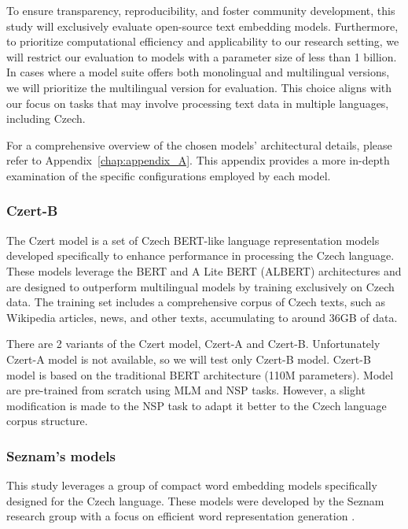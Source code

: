 To ensure transparency, reproducibility, and foster community development, this study will exclusively evaluate open-source text embedding models.  Furthermore, to prioritize computational efficiency and applicability to our research setting, we will restrict our evaluation to models with a parameter size of less than 1 billion.
In cases where a model suite offers both monolingual and multilingual versions, we will prioritize the multilingual version for evaluation. This choice aligns with our focus on tasks that may involve processing text data in multiple languages, including Czech.

For a comprehensive overview of the chosen models' architectural details, please refer to Appendix~\ref{chap:appendix_A}.
This appendix provides a more in-depth examination of the specific configurations employed by each model.

\subsubsection{Czert-B} \label{modelczert-b}

The Czert model \cite{sido2021czert} is a set of Czech \ac{BERT}-like language representation models developed specifically to enhance performance in processing the Czech language.
These models leverage the \ac{BERT} and A Lite \ac{BERT} (ALBERT) \cite{lan2020albert} architectures and are designed to outperform multilingual models by training exclusively on Czech data.
The training set includes a comprehensive corpus of Czech texts, such as Wikipedia articles, news, and other texts, accumulating to around 36GB of data.

There are 2 variants of the Czert model, Czert-A and Czert-B. Unfortunately Czert-A model is not available, so we will test only Czert-B model.
Czert-B model is based on the traditional \ac{BERT} architecture (110M parameters).
Model are pre-trained from scratch using \ac{MLM} and \ac{NSP} tasks. However, a slight modification is made to the \ac{NSP} task to adapt it better to the Czech language corpus structure.

\subsubsection{Seznam's models} \label{model:seznam}
This study leverages a group of compact word embedding models specifically designed for the Czech language.
These models were developed by the Seznam research group with a focus on efficient word representation generation \cite{bednář2023like}.

